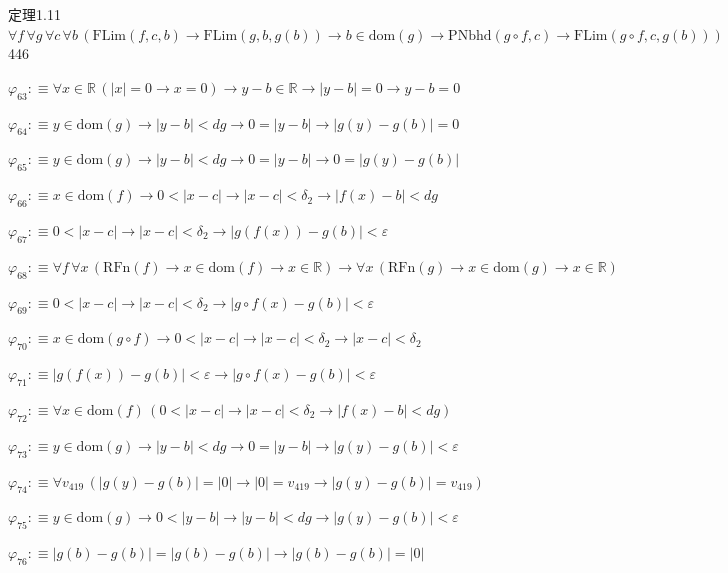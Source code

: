 \begin{fullproof}{定理1.11}{$\forall f\,\forall g\,\forall c\,\forall b\,(\mathrm{FLim}(f,c,b) \to \mathrm{FLim}(g,b,g(b)) \to b \in \mathrm{dom}(g) \to \mathrm{PNbhd}(g \circ f,c) \to \mathrm{FLim}(g \circ f,c,g(b)))$}{446}
\begin{abbrevlist}
\item $\varphi_{63} :\equiv \forall x \in \mathbb{R}\,(\lvert x \rvert = 0 \to x = 0) \to y - b \in \mathbb{R} \to \lvert y - b \rvert = 0 \to y - b = 0$
\item $\varphi_{64} :\equiv y \in \mathrm{dom}(g) \to \lvert y - b \rvert < \mathit{dg} \to 0 = \lvert y - b \rvert \to \lvert g(y) - g(b) \rvert = 0$
\item $\varphi_{65} :\equiv y \in \mathrm{dom}(g) \to \lvert y - b \rvert < \mathit{dg} \to 0 = \lvert y - b \rvert \to 0 = \lvert g(y) - g(b) \rvert$
\item $\varphi_{66} :\equiv x \in \mathrm{dom}(f) \to 0 < \lvert x - c \rvert \to \lvert x - c \rvert < \delta_{2} \to \lvert f(x) - b \rvert < \mathit{dg}$
\item $\varphi_{67} :\equiv 0 < \lvert x - c \rvert \to \lvert x - c \rvert < \delta_{2} \to \lvert g(f(x)) - g(b) \rvert < \varepsilon$
\item $\varphi_{68} :\equiv \forall f\,\forall x\,(\mathrm{RFn}(f) \to x \in \mathrm{dom}(f) \to x \in \mathbb{R}) \to \forall x\,(\mathrm{RFn}(g) \to x \in \mathrm{dom}(g) \to x \in \mathbb{R})$
\item $\varphi_{69} :\equiv 0 < \lvert x - c \rvert \to \lvert x - c \rvert < \delta_{2} \to \lvert g \circ f(x) - g(b) \rvert < \varepsilon$
\item $\varphi_{70} :\equiv x \in \mathrm{dom}(g \circ f) \to 0 < \lvert x - c \rvert \to \lvert x - c \rvert < \delta_{2} \to \lvert x - c \rvert < \delta_{2}$
\item $\varphi_{71} :\equiv \lvert g(f(x)) - g(b) \rvert < \varepsilon \to \lvert g \circ f(x) - g(b) \rvert < \varepsilon$
\item $\varphi_{72} :\equiv \forall x \in \mathrm{dom}(f)\,(0 < \lvert x - c \rvert \to \lvert x - c \rvert < \delta_{2} \to \lvert f(x) - b \rvert < \mathit{dg})$
\item $\varphi_{73} :\equiv y \in \mathrm{dom}(g) \to \lvert y - b \rvert < \mathit{dg} \to 0 = \lvert y - b \rvert \to \lvert g(y) - g(b) \rvert < \varepsilon$
\item $\varphi_{74} :\equiv \forall v_{419}\,(\lvert g(y) - g(b) \rvert = \lvert 0 \rvert \to \lvert 0 \rvert = v_{419} \to \lvert g(y) - g(b) \rvert = v_{419})$
\item $\varphi_{75} :\equiv y \in \mathrm{dom}(g) \to 0 < \lvert y - b \rvert \to \lvert y - b \rvert < \mathit{dg} \to \lvert g(y) - g(b) \rvert < \varepsilon$
\item $\varphi_{76} :\equiv \lvert g(b) - g(b) \rvert = \lvert g(b) - g(b) \rvert \to \lvert g(b) - g(b) \rvert = \lvert 0 \rvert$

\end{abbrevlist}
\end{fullproof}
